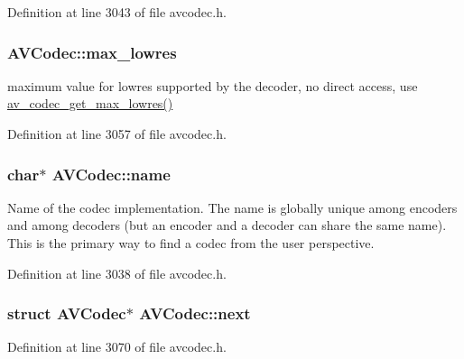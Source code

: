 Definition at line 3043 of file avcodec.\+h.

\subsubsection[{\texorpdfstring{max\+\_\+lowres}{max_lowres}}]{ A\+V\+Codec\+::max\+\_\+lowres}\hypertarget{struct_a_v_codec_afc51006d374ca72dfa3b0e29cbb1d981}{}\label{struct_a_v_codec_afc51006d374ca72dfa3b0e29cbb1d981}


maximum value for lowres supported by the decoder, no direct access, use \hyperlink{group__lavc__core_gafda0a87bc29a129cd12e858b4609cccd}{av\+\_\+codec\+\_\+get\+\_\+max\+\_\+lowres()} 



Definition at line 3057 of file avcodec.\+h.

\subsubsection[{\texorpdfstring{name}{name}}]{ char$\ast$ A\+V\+Codec\+::name}\hypertarget{struct_a_v_codec_ad3daa3e729850b573c139a83be8938ca}{}\label{struct_a_v_codec_ad3daa3e729850b573c139a83be8938ca}
Name of the codec implementation. The name is globally unique among encoders and among decoders (but an encoder and a decoder can share the same name). This is the primary way to find a codec from the user perspective. 

Definition at line 3038 of file avcodec.\+h.

\subsubsection[{\texorpdfstring{next}{next}}]{\setlength{\rightskip}{0pt plus 5cm}struct {\bf A\+V\+Codec}$\ast$ A\+V\+Codec\+::next}\hypertarget{struct_a_v_codec_ab423f961a2ce8ef9442010909a29dbf5}{}\label{struct_a_v_codec_ab423f961a2ce8ef9442010909a29dbf5}


Definition at line 3070 of file avcodec.\+h.

